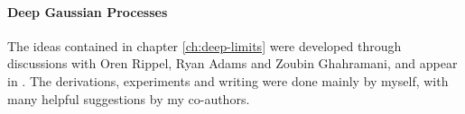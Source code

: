 \paragraph{Deep Gaussian Processes}
The ideas contained in chapter \ref{ch:deep-limits} were developed through discussions with Oren Rippel, Ryan Adams and Zoubin Ghahramani, and appear in \citep{DuvRipAdaGha14}.  The derivations, experiments and writing were done mainly by myself, with many helpful suggestions by my co-authors.

\outbpdocument{


}


